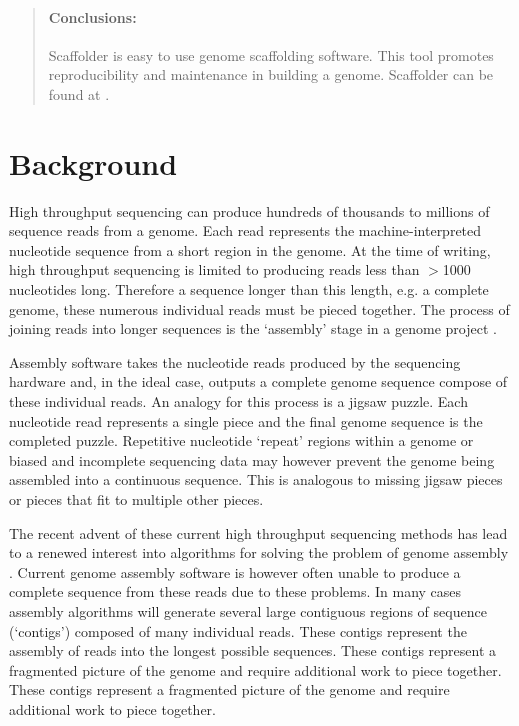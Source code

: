 \documentclass[10pt]{bmc_article}
\newenvironment{bmcformat}{\begin{raggedright}\baselineskip20pt\sloppy\setboolean{publ}{false}}{\end{raggedright}\baselineskip20pt\sloppy}
\begin{document}
\begin{bmcformat}
\begin{abstract}
  \paragraph*{Conclusions:} Scaffolder is easy to use genome scaffolding
  software. This tool promotes reproducibility and maintenance in building
  a genome. Scaffolder can be found at \scaffolder.

\end{abstract}


\clearpage

\section*{Background} %

High throughput sequencing can produce hundreds of thousands to millions of
sequence reads from a genome. Each read represents the machine-interpreted
nucleotide sequence from a short region in the genome. At the time of writing,
high throughput sequencing is limited to producing reads less than $>$1000
nucleotides long. Therefore a sequence longer than this length, e.g.
a complete genome, these numerous individual reads must be pieced together.
The process of joining reads into longer sequences is the `assembly' stage in
a genome project \cite{miller2010}. \pb

Assembly software takes the nucleotide reads produced by the sequencing
hardware and, in the ideal case, outputs a complete genome sequence compose of
these individual reads. An analogy for this process is a jigsaw puzzle. Each
nucleotide read represents a single piece and the final genome sequence is the
completed puzzle. Repetitive nucleotide `repeat' regions within a genome or
biased and incomplete sequencing data may however prevent the genome being
assembled into a continuous sequence. This is analogous to missing jigsaw
pieces or pieces that fit to multiple other pieces. \pb

The recent advent of these current high throughput sequencing methods has lead
to a renewed interest into algorithms for solving the problem of genome
assembly \cite{pop2008,pop2009}. Current genome assembly software is however
often unable to produce a complete sequence from these reads due to these
problems. In many cases assembly algorithms will generate several large
contiguous regions of sequence (`contigs') composed of many individual reads.
These contigs represent the assembly of reads into the longest possible
sequences. These contigs represent a fragmented picture of the genome and
require additional work to piece together. These contigs represent
a fragmented picture of the genome and require additional work to piece
together. \pb


\end{bmcformat}
\end{document}
